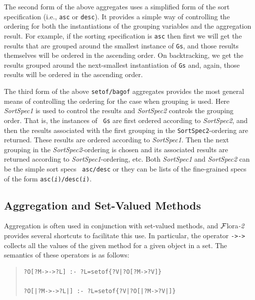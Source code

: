 \documentclass[11pt]{article}
\newcommand{\FLSYSTEM}{{\mbox{\sc ${\cal F}${lora}\rm\emph{-2}}}\xspace}
\begin{document}
The second form of the above aggregates uses a simplified form of the sort
specification (i.e., {\tt asc} or {\tt desc}). It provides a simple way of
controlling the ordering for both the instantiations of the grouping variables  
and the aggregation result. For example, if the sorting specification is
{\tt asc} then first we will get the results that are grouped around the
smallest instance of {\tt Gs}, and those results themselves will be ordered
in the ascending order. On backtracking, we get the results grouped around
the next-smallest instantiation of {\tt Gs} and, again, those results will
be ordered in the ascending order.

The third form of the above {\tt setof/bagof} aggregates provides the most
general means of controlling the ordering for the case when grouping is
used. Here {\it SortSpec1} is used to control the results and {\it
  SortSpec2} controls the grouping order.  That is, the instances of {\tt
  Gs} are first ordered according to {\it SortSpec2}, and then the results
associated with the first grouping in the {\tt SortSpec2}-ordering are
returned. These results are ordered according to {\it SortSpec1}. Then the
next grouping in the \emph{SortSpec2}-ordering is chosen and its associated
results are returned according to {\it SortSpec1}-ordering, etc. 
Both {\it SortSpec1} and {\it SortSpec2} can be the simple sort specs {\tt
  asc/desc}  or they can be lists of the
fine-grained specs of the form
{\tt asc({\it i})/desc({\it i})}.


\subsection {Aggregation and Set-Valued Methods}

\index{{\tt ->->}}
Aggregation is often used in conjunction with set-valued methods, and
\FLSYSTEM provides several shortcuts to facilitate this use.
In particular, the operator {\tt ->->} 
collects all the values of the given
method for a given object in a set. The semantics of these operators is
as follows:

\begin{quote}
\begin{verbatim}
?O[?M->->?L] :- ?L=setof{?V|?O[?M->?V]}

?O[|?M->->?L|] :- ?L=setof{?V|?O[|?M->?V|]}
\end{verbatim}
\end{quote}
\end{document}
